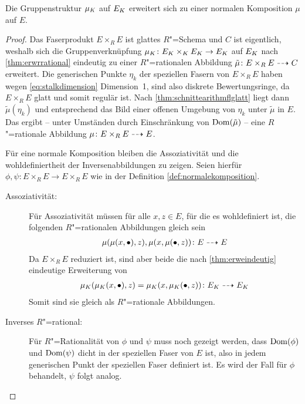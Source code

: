 \begin{Lemma}\label{thm:enormalekomposition}
  Die Gruppenstruktur $\mu_{K}$ auf $E_{K}$ erweitert sich zu einer
  normalen Komposition $\mu$ auf $E$.
  \begin{proof}
    Das Faserprodukt $E\times_R E$ ist glattes $R$"=Schema und $C$ ist
    eigentlich, weshalb sich die Gruppenverknüpfung
    ${\mu_{K}\colon E_{K}\times_{K} E_{K}\to E_{K}}$ auf $E_{K}$ nach
    \ref{thm:erwrrational} eindeutig zu einer $R$"=rationalen
    Abbildung $\tilde\mu\colon E\times_R E\dashrightarrow C$ erweitert.
    Die generischen Punkte $\eta_k$ der speziellen Fasern von
    $E\times_R E$ haben wegen \autoref{eq:stalkdimension}
    Dimension~1, sind also diskrete Bewertungsringe, da
    $E\times_R E$ glatt und somit regulär ist. Nach
    \ref{thm:schnittearithmflglatt} liegt dann
    $\tilde\mu(\eta_k)$ und entsprechend das Bild einer offenen
    Umgebung von $\eta_k$ unter $\tilde\mu$ in $E$. Das ergibt
    – unter Umständen durch Einschränkung von $\operatorname{Dom}(\tilde\mu)$ –
    eine $R$"=rationale Abbildung ${\mu\colon E\times_R E\dashrightarrow E}$.

    Für eine normale Komposition bleiben die Assoziativität und
    die wohldefiniertheit der Inversenabbildungen zu zeigen. Seien
    hierfür ${\phi,\psi\colon E\times_R E\to E\times_R E}$ 
    wie in der Definition \ref{def:normalekomposition}.

    \begin{description}
    \item[Assoziativität:]
      Für Assoziativität müssen für alle $x, {z\in E}$, für die es
      wohldefiniert ist, die folgenden $R$"=rationalen 
      Abbildungen gleich sein
      \begin{gather*}
        \mu(\mu(x,\bullet),z), \mu(x,\mu(\bullet,z))
        \colon E \dashrightarrow E
      \end{gather*}
      Da $E\times_R E$ reduziert ist, sind aber beide die nach
      \ref{thm:erweindeutig} eindeutige Erweiterung von
      \begin{gather*}
        \mu_{K}(\mu_{K}(x,\bullet),z)=\mu_{K}(x,\mu_{K}(\bullet,z))
        \colon E_{K} \dashrightarrow E_{K}
      \end{gather*}
      Somit sind sie gleich als $R$"=rationale Abbildungen.
      
    \item[Inverses $R$"=rational:]
      Für $R$"=Rationalität von $\phi$ und $\psi$ muss noch gezeigt
      werden, dass $\operatorname{Dom}(\phi)$ und $\operatorname{Dom}(\psi)$ dicht in der
      speziellen Faser von $E$ ist, also in jedem generischen Punkt
      der speziellen Faser definiert ist.
      Es wird der Fall für $\phi$ behandelt, $\psi$ folgt analog.
      

\end{description}
\end{proof}
\end{Lemma}
